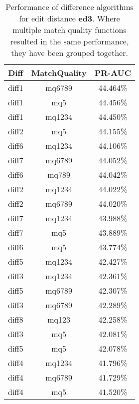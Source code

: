 \begin{table}[tbph]
\begin{center}
\begin{tabular}{|c|c||c|}
\hline
Diff & MatchQuality & PR-AUC  \\
\hline
\hline
diff1 & mq6789 & 44.464\% \\
diff1 & mq5 & 44.456\% \\
diff1 & mq1234 & 44.450\% \\
diff2 & mq5 & 44.155\% \\
diff6 & mq1234 & 44.106\% \\
diff7 & mq6789 & 44.052\% \\
diff6 & mq789 & 44.042\% \\
diff2 & mq1234 & 44.022\% \\
diff2 & mq6789 & 44.020\% \\
diff7 & mq1234 & 43.988\% \\
diff7 & mq5 & 43.889\% \\
diff6 & mq5 & 43.774\% \\
diff5 & mq1234 & 42.427\% \\
diff3 & mq1234 & 42.361\% \\
diff5 & mq6789 & 42.307\% \\
diff3 & mq6789 & 42.289\% \\
diff8 & mq123 & 42.258\% \\
diff3 & mq5 & 42.081\% \\
diff5 & mq5 & 42.078\% \\
diff4 & mq1234 & 41.796\% \\
diff4 & mq6789 & 41.729\% \\
diff4 & mq5 & 41.520\% \\
\hline
\end{tabular}
\end{center}
\caption{Performance of difference algorithms for
  edit distance \textbf{ed3}.  Where multiple match
  quality functions resulted in the same performance, they
  have been grouped together.}
\label{tab:editlongbyed3}
\end{table}
